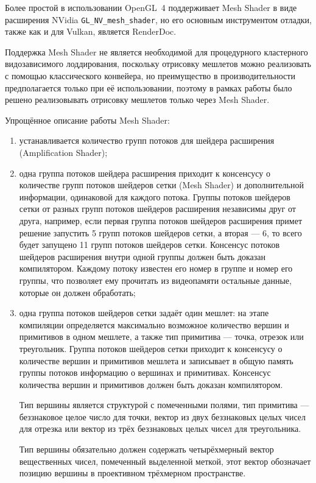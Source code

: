 Более простой в использовании OpenGL~4 поддерживает Mesh Shader в виде расширения NVidia \texttt{GL\_NV\_mesh\_shader}, но его основным инструментом отладки, также как и для Vulkan, является RenderDoc.

Поддержка Mesh Shader не является необходимой для процедурного кластерного видозависимого лоддирования, поскольку отрисовку мешлетов можно реализовать с помощью классического конвейера, но преимущество в производительности предполагается только при её использовании, поэтому в рамках работы было решено реализовывать отрисовку мешлетов только через Mesh Shader.

Упрощённое описание работы Mesh Shader:
\begin{enumerate}
    \item устанавливается количество групп потоков для шейдера расширения (Amplification Shader);
    \item одна группа потоков шейдера расширения приходит к консенсусу о количестве групп потоков шейдеров сетки (Mesh Shader) и дополнительной информации, одинаковой для каждого потока.
    Группы потоков шейдеров сетки от разных групп потоков шейдеров расширения независимы друг от друга, например, если первая группа потоков шейдеров расширения примет решение запустить 5 групп потоков шейдеров сетки, а вторая --- 6, то всего будет запущено 11 групп потоков шейдеров сетки.
    Консенсус потоков шейдеров расширения внутри одной группы должен быть доказан компилятором.
    Каждому потоку известен его номер в группе и номер его группы, что позволяет ему прочитать из видеопамяти остальные данные, которые он должен обработать;

    \item одна группа потоков шейдеров сетки задаёт один мешлет: на этапе компиляции определяется максимально возможное количество вершин и примитивов в одном мешлете, а также тип примитива --- точка, отрезок или треугольник.
    Группа потоков шейдеров сетки приходит к консенсусу о количестве вершин и примитивов мешлета и записывает в общую память группы потоков информацию о вершинах и примитивах.
    Консенсус количества вершин и примитивов должен быть доказан компилятором.

    Тип вершины является структурой с помеченными полями, тип примитива --- беззнаковое целое число для точки, вектор из двух беззнаковых целых чисел для отрезка или вектор из трёх беззнаковых целых чисел для треугольника.

    Тип вершины обязательно должен содержать четырёхмерный вектор вещественных чисел, помеченный выделенной меткой, этот вектор обозначает позицию вершины в проективном трёхмерном пространстве.


\end{enumerate}
